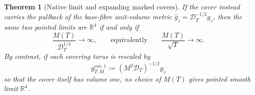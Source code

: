 \documentclass[11pt]{article}
\numberwithin{equation}{section}
\newtheorem{theorem}{Theorem}[section]
\theoremstyle{definition}
\theoremstyle{remark}
\newcommand{\R}{\mathbb R}
\begin{document}
\begin{theorem}[Native limit and expanding marked covers]
If the cover instead carries the pullback of the base-fibre unit-volume
metric $\widehat g_z=\mathcal D_T^{-1/2}g_z$, then the same two pointed
limits are $\R^4$ if and only if
\begin{equation}\label{eq:unit-volume-cover-condition}
 \frac{M(T)}{\mathcal D_T^{1/4}}\longrightarrow\infty,
 \qquad\text{equivalently}\qquad
 \frac{M(T)}{\sqrt T}\longrightarrow\infty.
\end{equation}
By contrast, if each covering torus is rescaled by
\begin{equation}\label{eq:cover-own-unit-volume-metric}
 g^{\mathrm{cov},1}_{T,M}:=(M^2\mathcal D_T)^{-1/2}g_z
\end{equation}
so that the cover itself has volume one, no choice of $M(T)$ gives pointed
smooth limit $\R^4$.
\end{theorem}
\end{document}
